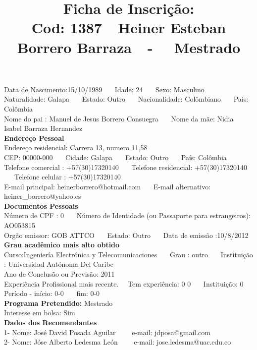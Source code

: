 \documentclass[11pt]{article}
\title{\vspace*{-4cm} Ficha de Inscrição: \\Cod: 1387\ \ Heiner Esteban Borrero Barraza\ \ - \ \ Mestrado 
 }
\date{}
\begin{document}
\maketitle
\vspace*{-1.5cm}
\noindent Data de Nascimento:15/10/1989
\ \ \ Idade: 24   \ \ \ Sexo: Masculino
\\
Naturalidade: Galapa  
\ \ \  Estado: Outro
\ \ \  Nacionalidade: Colômbiano
\ \ \ País: Colômbia
\\        
Nome do pai : Manuel de Jesus Borrero Consuegra
\ \ \ Nome da mãe: Nidia Isabel Barraza Hernandez          
\\[0.2cm]                     
\textbf{Endereço Pessoal} 
\\ 
\noindent Endereço residencial: Carrera 13, numero 11,58
\\
        CEP: 00000-000 
\ \ \ Cidade: Galapa 
\ \ \ Estado: Outro 
\ \ \ País: Colômbia
\\		
		Telefone comercial : +57(30)17320140
\ \ \ Telefone residencial: +57(30)17320140
\ \ \ Telefone celular : +57(30)17320140
\\
E-mail principal: heinerborrero@hotmail.com
\ \ \ E-mail alternativo: heiner\_borrero@yahoo.es 
\\[0.2cm] 
\textbf{Documentos Pessoais}
\\
\noindent Número de CPF : 0
\ \ \ Número de Identidade (ou Passaporte para estrangeiros): AO053815
\\
Orgão emissor: GOB ATTCO
\ \ \ Estado: Outro
\ \ \ Data de emissão :10/8/2012
\\[0.3cm]
\textbf{Grau acadêmico mais alto obtido}
\\	
Curso:Ingeniería Electrónica y Telecomunicaciones
\ \ \ Grau : outro
\ \ \ Instituição : Universidad Autónoma Del Caribe
\\			
Ano de Conclusão ou Previsão: 2011
\\ 
Experiência Profissional mais recente. \ \  
Tem experiência: 0 0  
\ \ \ Instituição: 0
\\  
Período - início: 0-0
\ \ \ fim: 0-0
\\[0.2cm] 
\textbf{Programa Pretendido:} Mestrado\\
Interesse em bolsa: Sim
\\[0.3cm]		
\textbf{Dados dos Recomendantes} 
\\
1- Nome: José David Posada Aguilar
\ \ \ \  e-mail: jdposa@gmail.com 
\\
2- Nome: Jóse Alberto Ledesma León
\ \ \ \ e-mail: jose.ledesma@uac.edu.co
\end{document}
